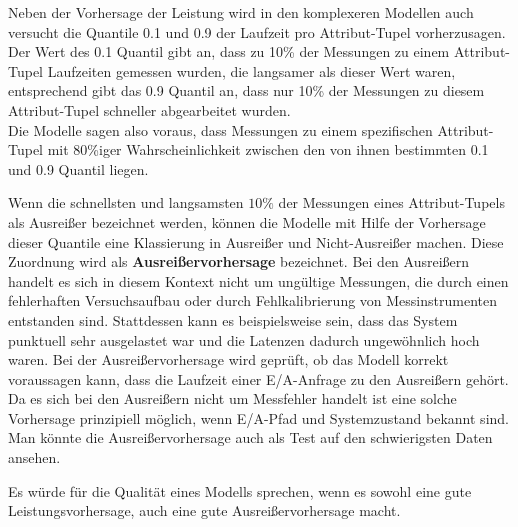 \documentclass[
	twoside,
	12pt,
	a4paper,
	BCOR10mm,
	DIV14,
	listof=totoc,
	bibliography=totoc,
	headsepline
]{scrreprt}
\begin{document}
Neben der Vorhersage der Leistung wird in den komplexeren Modellen auch versucht die Quantile 0.1 und 0.9 der Laufzeit pro Attribut-Tupel vorherzusagen. Der Wert des 0.1 Quantil gibt an, dass zu 10\% der Messungen zu einem Attribut-Tupel Laufzeiten gemessen wurden, die langsamer als dieser Wert waren, entsprechend gibt das 0.9 Quantil an, dass nur 10\% der Messungen zu diesem Attribut-Tupel schneller abgearbeitet wurden.\\
Die Modelle sagen also voraus, dass Messungen zu einem spezifischen Attribut-Tupel mit 80\%iger Wahrscheinlichkeit zwischen den von ihnen bestimmten 0.1 und 0.9 Quantil liegen.\medskip

Wenn die schnellsten und langsamsten $10\%$ der Messungen eines Attribut-Tupels als Ausreißer bezeichnet werden, können die Modelle mit Hilfe der Vorhersage dieser Quantile eine Klassierung in Ausreißer und Nicht-Ausreißer machen. Diese Zuordnung wird als \textbf{Ausreißervorhersage} bezeichnet.
Bei den Ausreißern handelt es sich in diesem Kontext nicht um ungültige Messungen, die durch einen fehlerhaften Versuchsaufbau oder durch Fehlkalibrierung von Messinstrumenten entstanden sind. Stattdessen kann es beispielsweise sein, dass das System punktuell sehr ausgelastet war und die Latenzen dadurch ungewöhnlich hoch waren. 
Bei der Ausreißervorhersage wird geprüft, ob das Modell korrekt voraussagen kann, dass die Laufzeit einer E/A-Anfrage zu den Ausreißern gehört. Da es sich bei den Ausreißern nicht um Messfehler handelt ist eine solche Vorhersage prinzipiell möglich, wenn E/A-Pfad und Systemzustand bekannt sind.
Man könnte die Ausreißervorhersage auch als Test auf den schwierigsten Daten ansehen. 

Es würde für die Qualität eines Modells sprechen, wenn es sowohl eine gute Leistungsvorhersage, auch eine gute Ausreißervorhersage macht.
\end{document}

